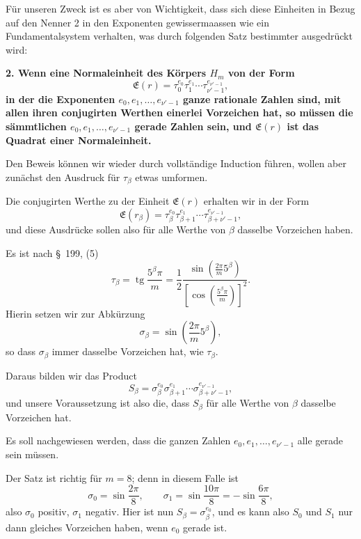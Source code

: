 \documentclass[11pt]{article}
\newcommand{\tg}{\operatorname{tg}}
\begin{document}
Für unseren Zweck ist es aber von Wichtigkeit, dass sich diese Einheiten in Bezug auf den Nenner 2 in den Exponenten
gewissermaassen wie ein Fundamentalsystem verhalten, was durch folgenden Satz bestimmter ausgedrückt wird:

\begin{center}\textbf{2. Wenn eine Normaleinheit des Körpers $H_m$ von der Form
\[
\mathfrak E(r)=\tau_0^{e_0}\tau_1^{e_1}\cdots\tau_{\nu'-1}^{e_{\nu'-1}},
\]
in der die Exponenten $e_0,e_1,\ldots,e_{\nu'-1}$ ganze rationale Zahlen sind, mit allen ihren conjugirten Werthen einerlei Vorzeichen hat, so müssen die sämmtlichen $e_0,e_1,\ldots,e_{\nu'-1}$ gerade Zahlen sein, und $\mathfrak E(r)$ ist das Quadrat einer Normaleinheit.}\end{center}

Den Beweis können wir wieder durch vollständige Induction führen, wollen aber zunächst den Ausdruck für $\tau_\beta$ etwas umformen.

Die conjugirten Werthe zu der Einheit $\mathfrak E(r)$ erhalten wir in der Form
\[
\mathfrak E(r_\beta)=\tau_\beta^{e_0}\tau_{\beta+1}^{e_1}\cdots\tau_{\beta+\nu'-1}^{e_{\nu'-1}},
\]
und diese Ausdrücke sollen also für alle Werthe von $\beta$ dasselbe Vorzeichen haben.

Es ist nach \S~199, (5)
\[
\tau_\beta=\tg\frac{5^\beta\pi}{m}=\frac12\frac{\sin\left(\frac{2\pi}{m}5^\beta\right)}{\left[\cos\left(\frac{5^\beta\pi}{m}\right)\right]^2}.
\]
Hierin setzen wir zur Abkürzung
\begin{equation}
\sigma_\beta=\sin\left(\frac{2\pi}{m}5^\beta\right),
\tag{14}
\end{equation}
so dass $\sigma_\beta$ immer dasselbe Vorzeichen hat, wie $\tau_\beta$.

Daraus bilden wir das Product
\begin{equation}
S_\beta=\sigma_\beta^{e_0}\sigma_{\beta+1}^{e_1}\cdots\sigma_{\beta+\nu'-1}^{e_{\nu'-1}},
\tag{15}
\end{equation}
und unsere Voraussetzung ist also die, dass $S_\beta$ für alle Werthe von $\beta$ dasselbe Vorzeichen hat.

Es soll nachgewiesen werden, dass die ganzen Zahlen $e_0,e_1,\ldots,e_{\nu'-1}$ alle gerade sein müssen.

Der Satz ist richtig für $m=8$; denn in diesem Falle ist
\[
\sigma_0=\sin\frac{2\pi}{8},\qquad \sigma_1=\sin\frac{10\pi}{8}=-\sin\frac{6\pi}{8},
\]
also $\sigma_0$ positiv, $\sigma_1$ negativ. Hier ist nun $S_\beta=\sigma_\beta^{e_0}$, und es kann also $S_0$ und $S_1$ nur dann gleiches Vorzeichen haben, wenn $e_0$ gerade ist.
\end{document}
